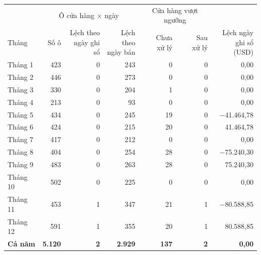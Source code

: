 \begin{tabular}{@{}l r r r r r r@{}}
\toprule
 & \multicolumn{3}{c}{Ô cửa hàng $\times$ ngày} & \multicolumn{2}{c}{Cửa hàng vượt ngưỡng} & \\
\cmidrule(lr){2-4}\cmidrule(lr){5-6}
Tháng & Số ô & \makecell[r]{Lệch theo\\ngày ghi sổ} & \makecell[r]{Lệch theo\\ngày bán} & \makecell[r]{Chưa\\xử lý} & \makecell[r]{Sau\\xử lý} & \makecell[r]{Lệch ngày\\ghi sổ (USD)} \\
\midrule
Tháng 1 & 423 & 0 & 243 & 0 & 0 & 0,00 \\
Tháng 2 & 446 & 0 & 273 & 0 & 0 & 0,00 \\
Tháng 3 & 330 & 0 & 204 & 1 & 0 & 0,00 \\
Tháng 4 & 213 & 0 & 93 & 0 & 0 & 0,00 \\
Tháng 5 & 434 & 0 & 245 & 19 & 0 & $-$41.464,78 \\
Tháng 6 & 424 & 0 & 215 & 20 & 0 & 41.464,78 \\
Tháng 7 & 417 & 0 & 212 & 0 & 0 & 0,00 \\
Tháng 8 & 404 & 0 & 254 & 28 & 0 & $-$75.240,30 \\
Tháng 9 & 483 & 0 & 263 & 28 & 0 & 75.240,30 \\
Tháng 10 & 502 & 0 & 225 & 0 & 0 & 0,00 \\
Tháng 11 & 453 & 1 & 347 & 21 & 1 & $-$80.588,85 \\
Tháng 12 & 591 & 1 & 355 & 20 & 1 & 80.588,85 \\
\midrule
\textbf{Cả năm} & \textbf{5.120} & \textbf{2} & \textbf{2.929} & \textbf{137} & \textbf{2} & \textbf{0,00} \\
\bottomrule
\end{tabular}
